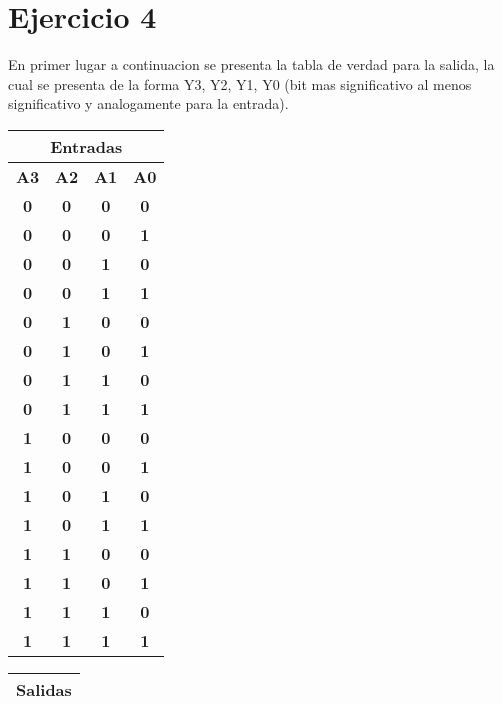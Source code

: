 \documentclass[english]{article}
\begin{document}
\section{Ejercicio 4}
En primer lugar a continuacion se presenta la tabla de verdad para la salida, la cual se presenta de la forma Y3, Y2, Y1, Y0 (bit mas significativo al menos significativo y analogamente para la entrada).
\begin{table}[htb] 
\centering  
\begin{tabular}{|c|c|c|c|}  
\hline  
\multicolumn{4}{|c|}{\textbf{Entradas}} \\ \hline  
\textbf{A3} & \textbf{A2} & \textbf{A1} & \textbf{A0} \\ \hline  
\textbf{0} & \textbf{0} & \textbf{0} & \textbf{0} \\ \hline  
\textbf{0} & \textbf{0} & \textbf{0} & \textbf{1} \\ \hline  
\textbf{0} & \textbf{0} & \textbf{1} & \textbf{0} \\ \hline  
\textbf{0} & \textbf{0} & \textbf{1} & \textbf{1} \\ \hline  
\textbf{0} & \textbf{1} & \textbf{0} & \textbf{0} \\ \hline  
\textbf{0} & \textbf{1} & \textbf{0} & \textbf{1} \\ \hline  
\textbf{0} & \textbf{1} & \textbf{1} & \textbf{0} \\ \hline  
\textbf{0} & \textbf{1} & \textbf{1} & \textbf{1} \\ \hline  
\textbf{1} & \textbf{0} & \textbf{0} & \textbf{0} \\ \hline  
\textbf{1} & \textbf{0} & \textbf{0} & \textbf{1} \\ \hline  
\textbf{1} & \textbf{0} & \textbf{1} & \textbf{0} \\ \hline  
\textbf{1} & \textbf{0} & \textbf{1} & \textbf{1} \\ \hline  
\textbf{1} & \textbf{1} & \textbf{0} & \textbf{0} \\ \hline  
\textbf{1} & \textbf{1} & \textbf{0} & \textbf{1} \\ \hline  
\textbf{1} & \textbf{1} & \textbf{1} & \textbf{0} \\ \hline  
\textbf{1} & \textbf{1} & \textbf{1} & \textbf{1} \\ \hline  
\end{tabular}  
\begin{tabular}{|c|c|c|c|} \hline 
\multicolumn{4}{|c|}{\textbf{Salidas}}                \\ \hline  

\end{tabular}
\end{table}
\end{document}
